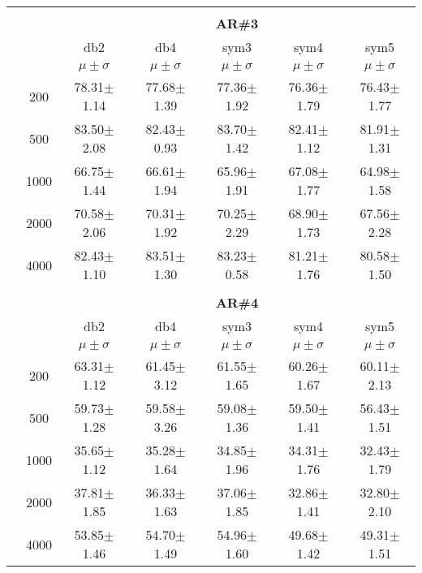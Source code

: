 \begin{table}[H]
\begin{tabular}{|c|c|c c c c c|}
\\ \midrule
\multicolumn{7}{c}{}\\ 



\cline{3-7}
\multicolumn{2}{c|}{\multirow{3}{*}{}} & \multicolumn{5}{c|}{\textbf{AR\#3}}   \\\cline{3-7} 

\multicolumn{2}{c|}{}  & db2 & db4 & sym3 & sym4 & sym5 \\\cline{3-7}
\multicolumn{2}{c|}{}& $\mu \pm \sigma$ & $\mu \pm \sigma$ & $\mu \pm \sigma$ & $\mu \pm \sigma$ & $\mu \pm \sigma$ \\\hline

\multicolumn{1}{|c|}{ \multirow{5}{*}{\rotatebox[origin=c]{90}{\textbf{Neurônios}}} }
&200	&78.31$\pm$1.14	&77.68$\pm$1.39	&77.36$\pm$1.92	&76.36$\pm$1.79	&76.43$\pm$1.77	\\\cline{2-7}
&500	&83.50$\pm$2.08	&82.43$\pm$0.93 &83.70$\pm$1.42	&82.41$\pm$1.12	&81.91$\pm$1.31	\\\cline{2-7}
&1000	&66.75$\pm$1.44	&66.61$\pm$1.94	&65.96$\pm$1.91	&67.08$\pm$1.77	&64.98$\pm$1.58	\\\cline{2-7}
&2000	&70.58$\pm$2.06	&70.31$\pm$1.92	&70.25$\pm$2.29	&68.90$\pm$1.73	&67.56$\pm$2.28	\\\cline{2-7}
&4000	&82.43$\pm$1.10	&83.51$\pm$1.30	&83.23$\pm$0.58	&81.21$\pm$1.76	&80.58$\pm$1.50	



\\\midrule 
\multicolumn{7}{c}{}\\ 



\cline{3-7}
\multicolumn{2}{c|}{\multirow{3}{*}{}} & \multicolumn{5}{c|}{\textbf{AR\#4}}   \\\cline{3-7} 

\multicolumn{2}{c|}{}  & db2 & db4 & sym3 & sym4 & sym5 \\\cline{3-7}
\multicolumn{2}{c|}{}& $\mu \pm \sigma$ & $\mu \pm \sigma$ & $\mu \pm \sigma$ & $\mu \pm \sigma$ & $\mu \pm \sigma$ \\\hline

\multicolumn{1}{|c|}{ \multirow{5}{*}{\rotatebox[origin=c]{90}{\textbf{Neurônios}}} }
&200	&63.31$\pm$1.12	&61.45$\pm$3.12	&61.55$\pm$1.65	&60.26$\pm$1.67	&60.11$\pm$2.13	\\\cline{2-7}
&500	&59.73$\pm$1.28	&59.58$\pm$3.26	&59.08$\pm$1.36	&59.50$\pm$1.41	&56.43$\pm$1.51	\\\cline{2-7}
&1000	&35.65$\pm$1.12	&35.28$\pm$1.64	&34.85$\pm$1.96	&34.31$\pm$1.76	&32.43$\pm$1.79	\\\cline{2-7}
&2000	&37.81$\pm$1.85	&36.33$\pm$1.63	&37.06$\pm$1.85	&32.86$\pm$1.41	&32.80$\pm$2.10	\\\cline{2-7}
&4000	&53.85$\pm$1.46	&54.70$\pm$1.49	&54.96$\pm$1.60	&49.68$\pm$1.42	&49.31$\pm$1.51	

\\\midrule
	\end{tabular}

\end{table}



